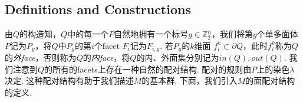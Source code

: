 \documentclass{article}
\theoremstyle{plain}%
\theoremstyle{definition}
\theoremstyle{remark}
\begin{document}
\subsection{Definitions and Constructions}

由$Q$的构造知，$Q$中的每一个$P$自然地拥有一个标号$g\in    \mathbb{Z}_2^n$，我们将第$g$个单多面体$P$记为$P_g$，将$Q$中$P_g$的第$i$个facet $F_i$记为$F_{i,g}$. 若$P_g$的$k$维面 $f^k_i\subset \partial Q$，此时$f^k_i$称为$Q$的{\em 外face}，否则称为$Q$的{\em 内face}，将$Q$的内、外面集分别记为$in(Q),out(Q)$. 
我们注意到$Q$的所有的facets上存在一种自然的配对结构. 配对的规则由$P$上的染色$\lambda$决定. 这种配对结构有助于我们描述$M$的基本群. 下面，我们引入$M$的面配对结构的定义.
\end{document}
